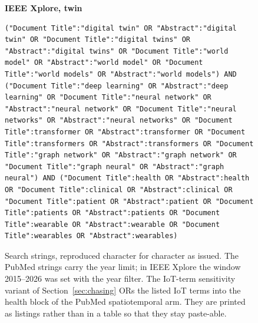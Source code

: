 \documentclass[journal]{IEEEtran}
\begin{document}
\begin{figure}[tp]
\begin{minipage}{\textwidth}
\begin{lstlisting}
\end{lstlisting}
\textbf{IEEE Xplore, twin}
\begin{lstlisting}
("Document Title":"digital twin" OR "Abstract":"digital twin" OR "Document Title":"digital twins" OR "Abstract":"digital twins" OR "Document Title":"world model" OR "Abstract":"world model" OR "Document Title":"world models" OR "Abstract":"world models") AND ("Document Title":"deep learning" OR "Abstract":"deep learning" OR "Document Title":"neural network" OR "Abstract":"neural network" OR "Document Title":"neural networks" OR "Abstract":"neural networks" OR "Document Title":transformer OR "Abstract":transformer OR "Document Title":transformers OR "Abstract":transformers OR "Document Title":"graph network" OR "Abstract":"graph network" OR "Document Title":"graph neural" OR "Abstract":"graph neural") AND ("Document Title":health OR "Abstract":health OR "Document Title":clinical OR "Abstract":clinical OR "Document Title":patient OR "Abstract":patient OR "Document Title":patients OR "Abstract":patients OR "Document Title":wearable OR "Abstract":wearable OR "Document Title":wearables OR "Abstract":wearables)
\end{lstlisting}
\end{minipage}
\caption{Search strings, reproduced character for character as issued. The PubMed strings carry the year limit; in IEEE Xplore the window 2015--2026 was set with the year filter. The IoT-term sensitivity variant of Section~\ref{sec:chasing} ORs the listed IoT terms into the health block of the PubMed spatiotemporal arm. They are printed as listings rather than in a table so that they stay paste-able.}
\label{fig:strings}
\end{figure}
\end{document}

